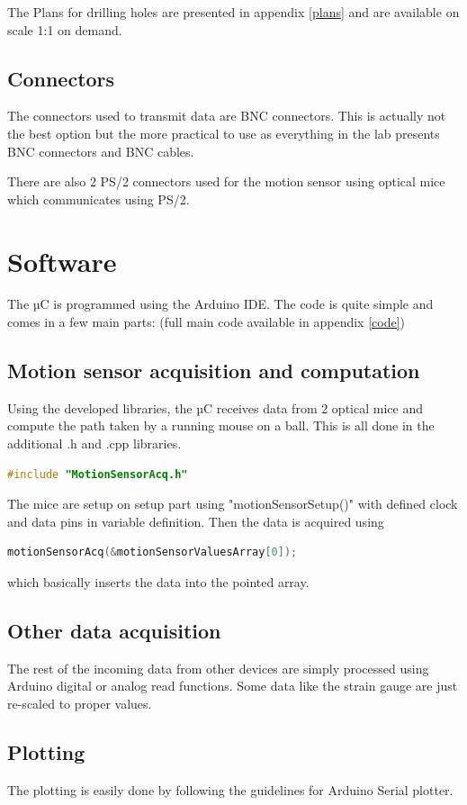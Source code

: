 \documentclass[a4paper]{article}
\begin{document}
The Plans for drilling holes are presented in appendix \ref{plans} and are available on scale 1:1 on demand.

\subsection{Connectors}
The connectors used to transmit data are BNC connectors. This is actually not the best option but the more practical to use as everything in the lab presents BNC connectors and BNC cables.

There are also 2 PS/2 connectors used for the motion sensor using optical mice which communicates using PS/2.

\section{Software}
The µC is programmed using the Arduino IDE.
The code is quite simple and comes in a few main parts:
(full main code available in appendix \ref{code})
\subsection{Motion sensor acquisition and computation}
Using the developed libraries, the µC receives data from 2 optical mice and compute the path taken by a running mouse on a ball.
This is all done in the additional .h and .cpp libraries.
\begin{lstlisting}[language=C++]
#include "MotionSensorAcq.h"
\end{lstlisting}

The mice are setup on setup part using "motionSensorSetup()" with defined clock and data pins in variable definition. Then the data is acquired using
\begin{lstlisting}[language=C++]
motionSensorAcq(&motionSensorValuesArray[0]);
\end{lstlisting}
which basically inserts the data into the pointed array.

\subsection{Other data acquisition}
The rest of the incoming data from other devices are simply processed using Arduino digital or analog read functions. Some data like the strain gauge are just re-scaled to proper values.

\subsection{Plotting}
The plotting is easily done by following the guidelines for Arduino Serial plotter.
\end{document}
